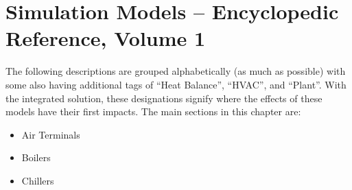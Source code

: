 \chapter{Simulation Models -- Encyclopedic Reference, Volume 1}\label{simulation-models---encyclopedic-reference}

The following descriptions are grouped alphabetically (as much as possible) with some also having additional tags of ``Heat Balance'', ``HVAC'', and ``Plant''. With the integrated solution, these designations signify where the effects of these models have their first impacts. The main sections in this chapter are:

\begin{itemize}
  \item Air Terminals
  \item Boilers
  \item Chillers
\end{itemize}
